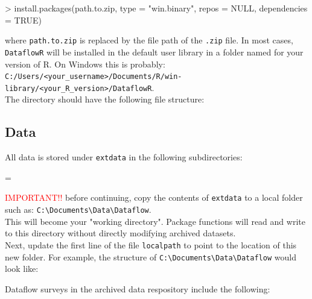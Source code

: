 \documentclass[12pt]{article}
\newenvironment{warning}
{\par\begin{mdframed}[linewidth=2pt,linecolor=red]
\begin{list}{}{\leftmargin=1cm
  \labelwidth=\leftmargin}\item[\Large\ding{43}]}
{\end{list}\end{mdframed}\par}
\begin{document}
\begin{Schunk}
\begin{Sinput}
> install.packages(path.to.zip, type = "win.binary", repos = NULL, dependencies = TRUE)
\end{Sinput}
\end{Schunk}

where \texttt{path.to.zip} is replaced by the file path of the \texttt{.zip} file. In most cases, \texttt{DataflowR} will be installed in the default user library in a folder named for your version of R. On Windows this is probably:\vspace{5pt}\\

\texttt{C:/Users/}\verb|<your_username>|\texttt{/Documents/R/win-library/}\verb|<your_R_version>|\texttt{/DataflowR}.\\

The directory should have the following file structure:


\subsection{Data}

All data is stored under \texttt{extdata} in the following subdirectories:\\

\vspace{15pt}
\begin{warning}
\textcolor{red}{IMPORTANT!!} before continuing, copy the contents of \texttt{extdata} to a local folder such as: \verb|C:\Documents\Data\Dataflow|.\\ This will become your "working directory". Package functions will read and write to this directory without directly modifying archived datasets.\\ Next, update the first line of the file \texttt{localpath} to point to the location of this new folder.
For example, the structure of \verb|C:\Documents\Data\Dataflow| would look like:


\end{warning}

Dataflow surveys in the archived data respository include the following:
\end{document}

